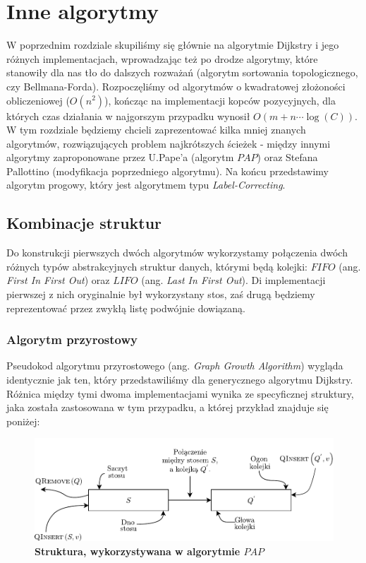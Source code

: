 \chapter{Inne algorytmy}

W poprzednim rozdziale skupiliśmy się głównie na algorytmie Dijkstry i jego różnych implementacjach, wprowadzając też po drodze algorytmy, które stanowiły dla nas tło do dalszych rozważań (algorytm sortowania topologicznego, czy Bellmana-Forda). Rozpoczęliśmy od algorytmów o kwadratowej złożoności obliczeniowej ($O \left( n^{2} \right)$), kończąc na implementacji kopców pozycyjnych, dla których czas działania w najgorszym przypadku wynosił $O \left( m + n \cdots \log \left( C \right) \right) $. W tym rozdziale będziemy chcieli zaprezentować kilka mniej znanych algorytmów, rozwiązujących problem najkrótszych ścieżek - między innymi algorytmy zaproponowane przez U.Pape'a (algorytm $PAP$) oraz Stefana Pallottino (modyfikacja poprzedniego algorytmu). Na końcu przedstawimy algorytm progowy, który jest algorytmem typu \textit{Label-Correcting}.

\section{Kombinacje struktur}

Do konstrukcji pierwszych dwóch algorytmów wykorzystamy połączenia dwóch różnych typów abstrakcyjnych struktur danych, którymi będą kolejki: $FIFO$ (ang. \textit{First In First Out}) oraz $LIFO$ (ang. \textit{Last In First Out}). Di implementacji pierwszej z nich oryginalnie był wykorzystany stos, zaś drugą będziemy reprezentować przez zwykłą listę podwójnie dowiązaną.

\subsection{Algorytm przyrostowy}

Pseudokod algorytmu przyrostowego (ang. \textit{Graph Growth Algorithm}) wygląda identycznie jak ten, który przedstawiliśmy dla generycznego algorytmu Dijkstry. Różnica między tymi dwoma implementacjami wynika ze specyficznej struktury, jaka została zastosowana w tym przypadku, a której przykład znajduje się poniżej:


\begin{figure}[!htbp]
	\centering
	\includegraphics[width=\textwidth]{Chapter_III/GRAPH-GROWTH-1Q-Other/a.pdf}
	\caption{\textbf{Struktura, wykorzystywana w algorytmie $PAP$}} \label{fig:examplePAPStructure}
\end{figure}

